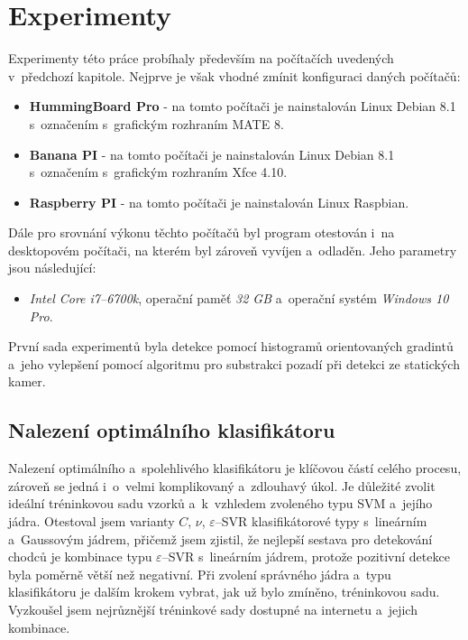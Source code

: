 \section{Experimenty}

Experimenty této práce probíhaly především na počítačích uvedených v~předchozí kapitole. Nejprve je však vhodné zmínit konfiguraci daných počítačů:
\begin{itemize}
\item\textbf{HummingBoard Pro} - na tomto počítači je nainstalován Linux Debian 8.1 s~označením  s~grafickým rozhraním MATE 8.
\item\textbf{Banana PI} - na tomto počítači je nainstalován Linux Debian 8.1 s~označením  s~grafickým rozhraním Xfce 4.10. 
\item\textbf{Raspberry PI} - na tomto počítači je nainstalován Linux Raspbian. 
\end{itemize}
Dále pro srovnání výkonu těchto počítačů byl program otestován i~na desktopovém počítači, na kterém byl zároveň vyvíjen a~odladěn. Jeho parametry jsou následující: 
\begin{itemize}
\item\textit{Intel Core i7--6700k}, operační paměť  \textit{32 GB} a~operační systém  \textit{Windows 10 Pro}.
\end{itemize}
První sada experimentů byla detekce pomocí histogramů orientovaných gradintů a~jeho vylepšení pomocí algoritmu pro substrakci pozadí při detekci ze statických kamer.

\subsection{Nalezení optimálního klasifikátoru}

Nalezení optimálního a~spolehlivého klasifikátoru je klíčovou částí celého procesu, zároveň se jedná i~o~velmi komplikovaný a~zdlouhavý úkol. Je důležité zvolit ideální tréninkovou sadu vzorků a~k~vzhledem zvoleného typu SVM a~jejího jádra. Otestoval jsem varianty $C$, $\nu$, $\varepsilon$--SVR klasifikátorové typy s~lineárním a~Gaussovým jádrem, přičemž jsem zjistil, že nejlepší sestava pro detekování chodců je kombinace typu $\varepsilon$--SVR s~lineárním jádrem, protože pozitivní detekce byla poměrně větší než negativní. Při zvolení správného jádra a~typu klasifikátoru je dalším krokem vybrat, jak už bylo zmíněno, tréninkovou sadu. Vyzkoušel jsem nejrůznější tréninkové sady dostupné na internetu a~jejich kombinace.

